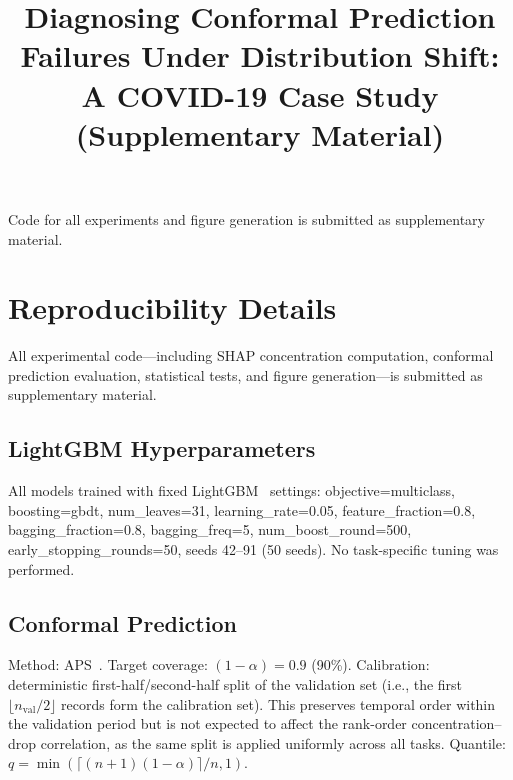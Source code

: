 \documentclass{uai2026} %
\begin{document}
\begin{contributions}
\end{contributions}

\begin{acknowledgements}
     Code for all experiments and figure generation is submitted as supplementary material.
\end{acknowledgements}



\newpage
\onecolumn

\title{Diagnosing Conformal Prediction Failures Under Distribution Shift:\\A COVID-19 Case Study (Supplementary Material)}
\maketitle

\appendix

\section{Reproducibility Details}\label{app:reproducibility}

All experimental code---including SHAP concentration computation, conformal prediction evaluation, statistical tests, and figure generation---is submitted as supplementary material.

\subsection{LightGBM Hyperparameters}

All models trained with fixed LightGBM~\citep{ke2017lightgbm} settings: objective=multiclass, boosting=gbdt, num\_leaves=31, learning\_rate=0.05, feature\_fraction=0.8, bagging\_fraction=0.8, bagging\_freq=5, num\_boost\_round=500, early\_stopping\_rounds=50, seeds 42--91 (50 seeds). No task-specific tuning was performed.

\subsection{Conformal Prediction}

Method: APS~\citep{romano2020classification}. Target coverage: $(1-\alpha)=0.9$ (90\%). Calibration: deterministic first-half/second-half split of the validation set (i.e., the first $\lfloor n_{\text{val}}/2 \rfloor$ records form the calibration set). This preserves temporal order within the validation period but is not expected to affect the rank-order concentration--drop correlation, as the same split is applied uniformly across all tasks. Quantile: $q = \min(\lceil(n+1)(1-\alpha)\rceil/n, 1)$.
\end{document}
